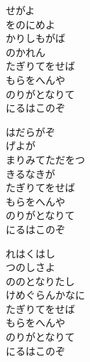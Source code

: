 \documentclass[10pt,b5j]{tarticle} %
\begin{document}
\vspace{1.5em} %
\newcommand{\linespace}{0.5em} %
\newcommand{\blocksize}{0.5\hsize} %
\begin{enumerate} %
    \begin{minipage}[c]{\blocksize}
    
        \vspace{\linespace}
        \item
        せがよ\\
        をのにめよ\\
        かりしもがば\\
        のかれん\\
        たぎりてをせば\\
        もらをへんや\\
        のりがとなりて\\
        にるはこのぞ
        
        \vspace{\linespace}
        \item
        はだらがぞ\\
        げよが\\
        まりみてただをつ\\
        きるなきが\\
        たぎりてをせば\\
        もらをへんや\\
        のりがとなりて\\
        にるはこのぞ
        
        \vspace{\linespace}
        \item
        れはくはし\\
        つのしさよ\\
        ののとなりたし\\
        けめぐらんかなに\\
        たぎりてをせば\\
        もらをへんや\\
        のりがとなりて\\
        にるはこのぞ
    

\end{minipage}
\end{enumerate}
\end{document}
